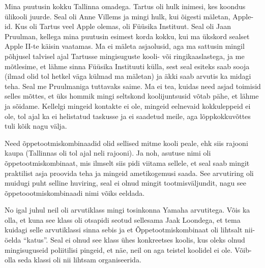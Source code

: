 Mina puutusin kokku Tallinna omadega. Tartus oli hulk inimesi, kes koondus ülikooli 
juurde. Seal oli Anne Villems ja mingi hulk, kui 
õigesti mäletan,  Apple-id. Kus oli Tartus veel Apple olemas, oli Füüsika 
Instituut. Seal oli Jaan 
Pruulman, kellega mina puutusin esimest korda  kokku, 
kui  ma ükskord sealset Apple II-te käisin vaatamas. Ma ei 
mäleta asjaolusid, aga ma sattusin mingil põhjusel talvisel ajal Tartusse mingisuguste kooli- või 
ringikaaslastega, ja  me mõtlesime, et lähme sinna Füüsika Instituuti külla, 
sest seal esiteks saab sooja (ilmad olid tol hetkel väga külmad ma mäletan) ja 
äkki saab arvutis ka midagi teha. Seal me Pruulmaniga tuttavaks saime. Ma ei 
tea, kuidas need asjad toimisid selles mõttes, et üks hommik mingi seltskond 
koolijuntsusid võtab pähe, et lähme ja sõidame. Kellelgi mingeid kontakte ei 
ole, mingeid eelnevaid kokkuleppeid ei ole, tol ajal ka ei helistatud taskusse ja ei saadetud 
meile, aga lõppkokkuvõttes tuli kõik nagu  välja.

\label{content!OTK}

Need õppetootmiskombinaadid olid sellised mitme kooli peale, ehk siis rajooni 
kaupa (Tallinnas oli tol ajal neli rajooni). 
Ja noh, asutuse nimi oli õppetootmiskombinaat, mis ilmselt siis pidi viitama 
sellele, et seal saab mingit praktilist asja proovida teha ja mingeid 
ametikogemusi saada. See arvutiring oli muidugi puht selline huviring, seal ei 
olnud mingit  tootmisväljundit, nagu see õppetoootmiskombinaadi nimi võiks 
eeldada.


No igal juhul neil oli arvutiklass mingi tosinkonna Yamaha arvutitega. Võis ka olla, et 
kuna see klass oli otsapidi seotud sellesama Jaak Loondega, et tema kuidagi selle arvutiklassi sinna sebis ja et 
Õppetootmiskombinaat oli lihtsalt nii-öelda \enquote{katus}. Seal  ei olnud see 
klass ühes konkreetses koolis, kus oleks olnud mingisuguseid poliitilisi pingeid, 
et näe, neil on aga teistel koolidel ei ole. Võib-olla seda klassi oli nii lihtsam 
organiseerida. 


